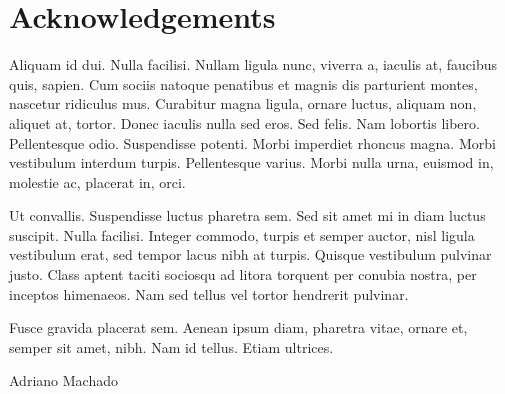 \chapter*{Acknowledgements}

Aliquam id dui. Nulla facilisi. Nullam ligula nunc, viverra a, iaculis
at, faucibus quis, sapien. Cum sociis natoque penatibus et magnis dis
parturient montes, nascetur ridiculus mus. Curabitur magna ligula,
ornare luctus, aliquam non, aliquet at, tortor. Donec iaculis nulla
sed eros. Sed felis. Nam lobortis libero. Pellentesque
odio. Suspendisse potenti. Morbi imperdiet rhoncus magna. Morbi
vestibulum interdum turpis. Pellentesque varius. Morbi nulla urna,
euismod in, molestie ac, placerat in, orci. 

Ut convallis. Suspendisse luctus pharetra sem. Sed sit amet mi in diam
luctus suscipit. Nulla facilisi. Integer commodo, turpis et semper
auctor, nisl ligula vestibulum erat, sed tempor lacus nibh at
turpis. Quisque vestibulum pulvinar justo. Class aptent taciti
sociosqu ad litora torquent per conubia nostra, per inceptos
himenaeos. Nam sed tellus vel tortor hendrerit pulvinar.  

Fusce gravida placerat sem. Aenean ipsum diam, pharetra vitae, ornare
et, semper sit amet, nibh. Nam id tellus. Etiam ultrices.  

\vspace{10mm}

\begin{flushleft}
Adriano Machado
\end{flushleft}